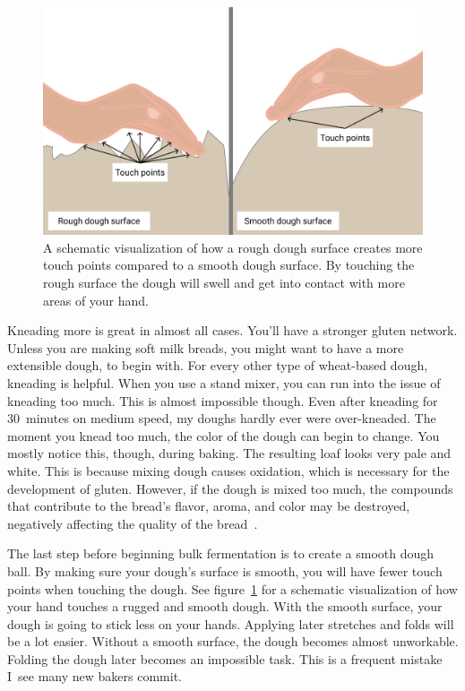 \begin{figure}[!htb]
  \includegraphics[width=\textwidth]{dough-surface-touchpoints}
  \caption[Touching the dough surface]{A schematic visualization of how a rough
      dough surface creates more touch points compared to a smooth dough
      surface.  By touching the rough surface the dough will swell and get into
      contact with more areas of your hand.}%
  \label{fig:dough-touch-points}
\end{figure}

Kneading more is great in almost all cases. You'll have a stronger
gluten network. Unless you are making soft milk breads, you
might want to have a more extensible dough, to begin with. For every
other type of wheat-based dough, kneading is helpful. When you use
a stand mixer, you can run into the issue of kneading too much. This
is almost impossible though. Even after kneading for 30~minutes on medium
speed, my doughs hardly ever were over-kneaded. The moment you knead
too much, the color of the dough can begin to change. You mostly
notice this, though, during baking. The resulting loaf looks very
pale and white. This is because mixing dough causes oxidation,
which is necessary for the development of gluten.
However, if the dough is mixed too much, the compounds that contribute
to the bread's flavor, aroma, and color may be destroyed, negatively
affecting the quality of the bread~\cite{oxidization+dough}.

The last step before beginning bulk fermentation is to
create a smooth dough ball. By making sure your dough's surface is
smooth, you will have fewer touch points when touching the dough.
See figure~\ref{fig:dough-touch-points} for a schematic visualization
of how your hand touches a rugged and smooth dough.
With the smooth surface, your dough is going to stick less on your hands. Applying
later stretches and folds will be a lot easier. Without a smooth
surface, the dough becomes almost unworkable. Folding the dough later
becomes an impossible task. This is a frequent mistake I~see many
new bakers commit.

